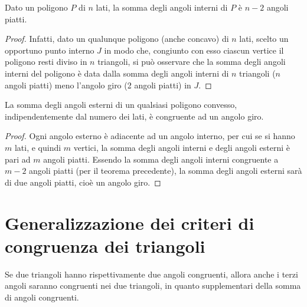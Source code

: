 \begin{teorema}
Dato un poligono $P$ di $n$ lati, la somma degli angoli interni di $P$ è $n-2$ angoli piatti.
\end{teorema}
\noindent \begin{minipage}{0.5\textwidth}
\begin{proof}
Infatti, dato un qualunque poligono (anche concavo) di $n$ lati, scelto un opportuno punto interno $J$ in modo che, congiunto con esso ciascun vertice il poligono resti diviso in $n$ triangoli, si può osservare che la somma degli angoli interni del poligono è data dalla somma degli angoli interni di $n$ triangoli ($n$ angoli piatti) meno l'angolo giro (2 angoli piatti) in $J$.
\end{proof}
\end{minipage}\hfil
\begin{minipage}{0.5\textwidth}
\centering
\end{minipage}

\begin{teorema}
La somma degli angoli esterni di un qualsiasi poligono convesso, indipendentemente dal numero dei lati, è congruente ad un angolo giro.
\end{teorema}
\noindent \begin{minipage}{0.5\textwidth}
\begin{proof}
Ogni angolo esterno è adiacente ad un angolo interno, per cui se si hanno $m$ lati, e quindi $m$ vertici, la somma degli angoli interni e degli angoli esterni è pari ad $m$ angoli piatti. Essendo la somma degli angoli interni congruente a $m-2$ angoli piatti (per il teorema precedente), la somma degli angoli esterni sarà di due angoli piatti, cioè un angolo giro.
\end{proof}
\end{minipage}\hfil
\begin{minipage}{0.5\textwidth}
\centering
\end{minipage}


\section{Generalizzazione dei criteri di congruenza dei triangoli}

Se due triangoli hanno rispettivamente due angoli congruenti, allora anche i terzi angoli saranno congruenti nei due triangoli, in quanto supplementari della somma di angoli congruenti.

